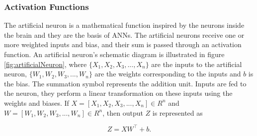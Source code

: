 \subsubsection{Activation Functions}



The artificial neuron is a mathematical function inspired by the neurons inside the brain and they are the basis of \acp{ANN}. The artificial neurons receive one or more weighted inputs and bias, and their sum is passed through an activation function. An artificial neuron's schematic diagram is illustrated in figure \ref{fig:artificialNeuron}, where $\{X_1, X_2, X_3, ..., X_n\}$ are the inputs to the artificial neuron, $\{W_1, W_2, W_3, ..., W_n\}$ are the weights corresponding to the inputs and $b$ is the bias. The summation symbol represents the addition unit. Inputs are fed to the neuron, they perform a linear transformation on these inputs using the weights and biases. If $X = [X_1, X_2, X_3, ..., X_n]  \in R^{n}$  and  $W = [W_1, W_2, W_3, ..., W_n] \in R^{n}$, then output $Z$ is represented as

\begin{equation}\label{linearRegression}
Z=X{W}^\intercal + b.
\end{equation}

